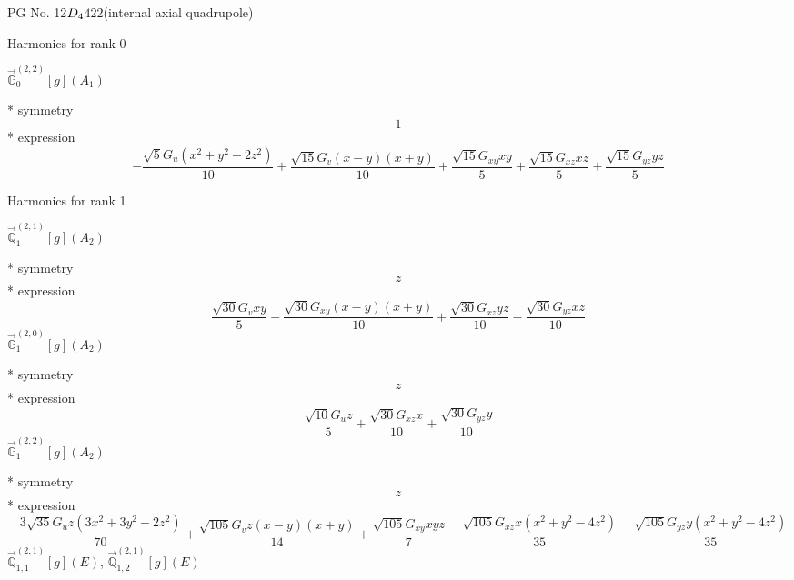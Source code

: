 \documentclass[fleqn,8pt]{jsarticle}
\begin{document}
\setcounter{MaxMatrixCols}{32}

\renewcommand{\tablename}{Table~}
\renewcommand{\figurename}{Figure~}
\begin{center}
\LARGE
PG No. 12\quad$D_{\rm 4}$\quad$422$\quad[ tetragonal ] (internal axial quadrupole)
\end{center}

\noindent * Harmonics for rank 0

\noindent\quad $\vec{\mathbb{G}}_{0}^{(2,2)}[g](A_{1})$

\noindent\quad ** symmetry
\begin{dmath*}
1
\end{dmath*}
\noindent\quad ** expression
\begin{dmath*}
- \frac{\sqrt{5} G_{u} \left(x^{2} + y^{2} - 2 z^{2}\right)}{10} + \frac{\sqrt{15} G_{v} \left(x - y\right) \left(x + y\right)}{10} + \frac{\sqrt{15} G_{xy} x y}{5} + \frac{\sqrt{15} G_{xz} x z}{5} + \frac{\sqrt{15} G_{yz} y z}{5}
\end{dmath*}

\noindent * Harmonics for rank 1

\noindent\quad $\vec{\mathbb{Q}}_{1}^{(2,1)}[g](A_{2})$

\noindent\quad ** symmetry
\begin{dmath*}
z
\end{dmath*}
\noindent\quad ** expression
\begin{dmath*}
\frac{\sqrt{30} G_{v} x y}{5} - \frac{\sqrt{30} G_{xy} \left(x - y\right) \left(x + y\right)}{10} + \frac{\sqrt{30} G_{xz} y z}{10} - \frac{\sqrt{30} G_{yz} x z}{10}
\end{dmath*}
\noindent\quad $\vec{\mathbb{G}}_{1}^{(2,0)}[g](A_{2})$

\noindent\quad ** symmetry
\begin{dmath*}
z
\end{dmath*}
\noindent\quad ** expression
\begin{dmath*}
\frac{\sqrt{10} G_{u} z}{5} + \frac{\sqrt{30} G_{xz} x}{10} + \frac{\sqrt{30} G_{yz} y}{10}
\end{dmath*}
\noindent\quad $\vec{\mathbb{G}}_{1}^{(2,2)}[g](A_{2})$

\noindent\quad ** symmetry
\begin{dmath*}
z
\end{dmath*}
\noindent\quad ** expression
\begin{dmath*}
- \frac{3 \sqrt{35} G_{u} z \left(3 x^{2} + 3 y^{2} - 2 z^{2}\right)}{70} + \frac{\sqrt{105} G_{v} z \left(x - y\right) \left(x + y\right)}{14} + \frac{\sqrt{105} G_{xy} x y z}{7} - \frac{\sqrt{105} G_{xz} x \left(x^{2} + y^{2} - 4 z^{2}\right)}{35} - \frac{\sqrt{105} G_{yz} y \left(x^{2} + y^{2} - 4 z^{2}\right)}{35}
\end{dmath*}
\noindent\quad $\vec{\mathbb{Q}}_{1,1}^{(2,1)}[g](E)$, $\vec{\mathbb{Q}}_{1,2}^{(2,1)}[g](E)$
\end{document}
